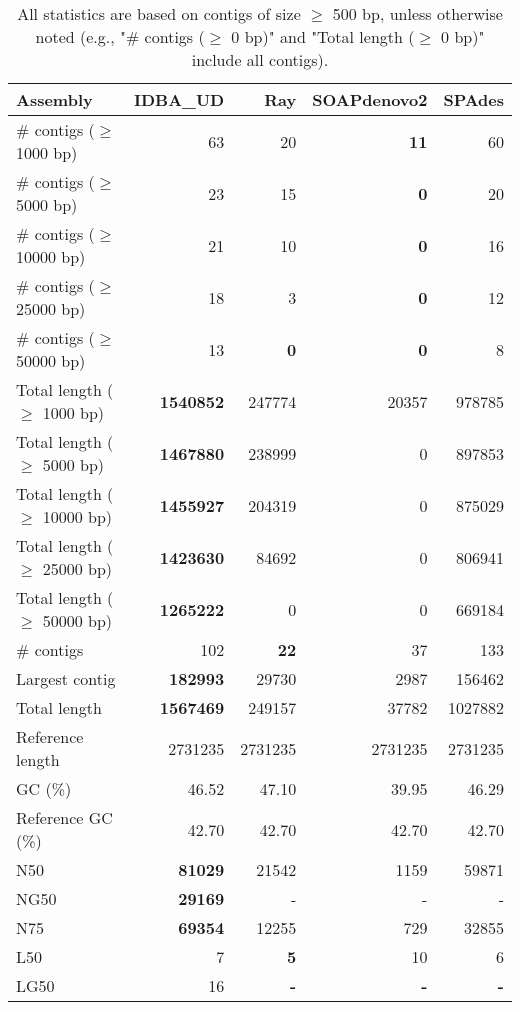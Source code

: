 \documentclass[12pt,a4paper]{article}
\begin{document}
\begin{table}[ht]
\begin{center}
\caption{All statistics are based on contigs of size $\geq$ 500 bp, unless otherwise noted (e.g., "\# contigs ($\geq$ 0 bp)" and "Total length ($\geq$ 0 bp)" include all contigs).}
\begin{tabular}{|l*{4}{|r}|}
\hline
Assembly & IDBA\_UD & Ray & SOAPdenovo2 & SPAdes \\ \hline
\# contigs ($\geq$ 1000 bp) & 63 & 20 & {\bf 11} & 60 \\ \hline
\# contigs ($\geq$ 5000 bp) & 23 & 15 & {\bf 0} & 20 \\ \hline
\# contigs ($\geq$ 10000 bp) & 21 & 10 & {\bf 0} & 16 \\ \hline
\# contigs ($\geq$ 25000 bp) & 18 & 3 & {\bf 0} & 12 \\ \hline
\# contigs ($\geq$ 50000 bp) & 13 & {\bf 0} & {\bf 0} & 8 \\ \hline
Total length ($\geq$ 1000 bp) & {\bf 1540852} & 247774 & 20357 & 978785 \\ \hline
Total length ($\geq$ 5000 bp) & {\bf 1467880} & 238999 & 0 & 897853 \\ \hline
Total length ($\geq$ 10000 bp) & {\bf 1455927} & 204319 & 0 & 875029 \\ \hline
Total length ($\geq$ 25000 bp) & {\bf 1423630} & 84692 & 0 & 806941 \\ \hline
Total length ($\geq$ 50000 bp) & {\bf 1265222} & 0 & 0 & 669184 \\ \hline
\# contigs & 102 & {\bf 22} & 37 & 133 \\ \hline
Largest contig & {\bf 182993} & 29730 & 2987 & 156462 \\ \hline
Total length & {\bf 1567469} & 249157 & 37782 & 1027882 \\ \hline
Reference length & 2731235 & 2731235 & 2731235 & 2731235 \\ \hline
GC (\%) & 46.52 & 47.10 & 39.95 & 46.29 \\ \hline
Reference GC (\%) & 42.70 & 42.70 & 42.70 & 42.70 \\ \hline
N50 & {\bf 81029} & 21542 & 1159 & 59871 \\ \hline
NG50 & {\bf 29169} & - & - & - \\ \hline
N75 & {\bf 69354} & 12255 & 729 & 32855 \\ \hline
L50 & 7 & {\bf 5} & 10 & 6 \\ \hline
LG50 & 16 & {\bf -} & {\bf -} & {\bf -} \\ \hline

\end{tabular}
\end{center}
\end{table}
\end{document}
